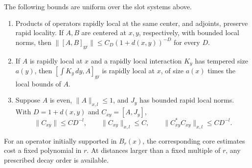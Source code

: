 \begin{lemma}
\label{locality:calculus}
The following bounds are uniform over the slot systems above.
\begin{enumerate}
\renewcommand{\labelenumi}{\textup{(\roman{enumi})}}
\item Products of operators rapidly local at the same center, and
adjoints, preserve rapid locality.  If $A,B$ are
centered at $x,y$, respectively, with bounded local norms, then
$\|[A,B]_{\mathrm{gr}}\|\leq C_D(1+d(x,y))^{-D}$ for every $D$.
\item If $A$ is rapidly local at $x$ and a rapidly local interaction
$K_y$ has tempered size $a(y)$, then
$[\int K_y\,dy,A]_{\mathrm{gr}}$ is rapidly local at $x$, of size
$a(x)$ times the local bounds of $A$.
\item Suppose $A$ is even, $\|A\|_{x,l}\leq1$, and $J_y$ has bounded
rapid local norms.  With $D=1+d(x,y)$ and $C_{xy}=[A,J_y]$,
\begin{equation}
 \|C_{xy}\|\leq C D^{-l},\qquad
 \|C_{xy}\|_{x,l}\leq C,\qquad
 \|C_{xy}^*C_{xy}\|_{x,l}\leq C D^{-l}.
 \label{eq:commutator-square-locality}
\end{equation}
\end{enumerate}
For an operator initially supported in $B_r(x)$, the corresponding
core estimates cost a fixed polynomial in $r$.  At distances larger
than a fixed multiple of $r$, any prescribed decay order is available.
\end{lemma}

